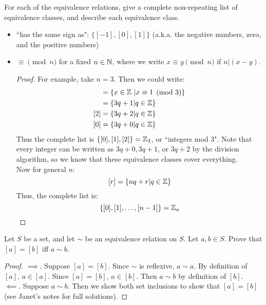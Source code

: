 \begin{example}
For each of the equivalence relations, give a complete non-repeating list of equivalence classes, and describe each equivalence class.
\begin{itemize}
    \item ``has the same sign as": $\{[-1], [0], [1]\}$ (a.k.a. the negative numbers, zero, and the positive numbers)
    \item $\equiv \pmod n$ for a fixed $n \in \mathbb{N}$, where we write $x \equiv y \pmod n$ if $n | (x-y)$.
    \begin{proof}
    For example, take $n = 3$. Then we could write:
    \begin{align*}
    [1] &= \{x \in \Z \ | x \equiv 1 \pmod 3\} \\
    &= \{3q + 1 | q \in \Z\}\\
    [2] &= \{3q + 2 | q \in \Z\}\\
    [0] &= \{3q + 0 | q \in \Z\}
    \end{align*}
    Thus the complete list is $\{[0], [1], [2]\} = \mathbb{Z}_3$, or ``integers mod 3". Note that every integer can be written as $3q+0, 3q+1$, or $3q+2$ by the division algorithm, so we know that these equivalence classes cover everything.\\
    
    Now for general $n$:
    \[
    [r] = \{nq + r | q \in \mathbb{Z}\}
    \]
    Thus, the complete list is:
    \[
    \{[0], [1], \dots, [n-1]\} = \mathbb{Z}_n
    \]
    \end{proof}
\end{itemize}
\end{example}

\begin{example}
Let $S$ be a set, and let $\sim$ be an equivalence relation on $S$. Let $a, b \in S$. Prove that $[a] = [b]$ iff $a \sim b$.
\end{example}

\begin{proof}
$\implies$. Suppose $[a] = [b]$. Since $\sim$ is reflexive, $a \sim a$. By definition of $[a]$, $a \in [a]$. Since $[a] = [b]$, $a \in [b]$. Then $a \sim b$ by definition of $[b]$.\\

$\impliedby$. Suppose $a \sim b$. Then we show both set inclusions to show that $[a] = [b]$ (see Janet's notes for full solutions).
\end{proof}